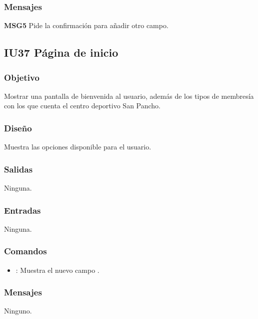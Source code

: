 \subsubsection{Mensajes}
	\begin{Citemize}
		\item {\bf MSG5} Pide la confirmación para añadir otro campo.
	\end{Citemize}


\subsection{IU37 Página de inicio}

\subsubsection{Objetivo}
	Mostrar una pantalla de bienvenida al usuario, además de los tipos de membresía con los que cuenta el centro deportivo San Pancho.

\subsubsection{Diseño}
	Muestra las opciones disponible para el usuario.


\subsubsection{Salidas}

	Ninguna.

\subsubsection{Entradas}
	Ninguna.

\subsubsection{Comandos}
\begin{itemize}
	\item {}: Muestra el nuevo campo .
\end{itemize}

\subsubsection{Mensajes}
	\begin{Citemize}
		\item Ninguno.
	\end{Citemize}